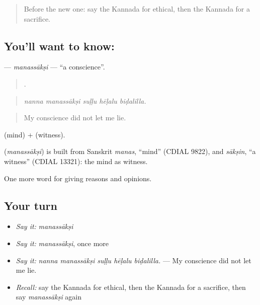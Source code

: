 \label{lesson:KA-C388-manassaksi}



\begin{quote}
Before the new one: say the Kannada for ethical, then the Kannada for a sacrifice.
\end{quote}

\subsection*{You'll want to know: }
\textbf{} — \emph{manassākṣi} — \textquotedblleft{}a conscience\textquotedblright{}.

\begin{quote}
    .
\end{quote}

\begin{quote}
\emph{nanna manassākṣi suḷḷu hēḷalu biḍalilla.}
\end{quote}

\begin{quote}
My conscience did not let me lie.
\end{quote}

 (mind) +  (witness).

\begin{cousinweb}
\textbf{} (\emph{manassākṣi}) is built from Sanskrit \emph{manas}, \textquotedblleft{}mind\textquotedblright{} (CDIAL 9822), and \emph{sākṣin}, \textquotedblleft{}a witness\textquotedblright{} (CDIAL 13321): the mind as witness.
\end{cousinweb}

\begin{grammarlens}[title={What you've built}]
One more word for giving reasons and opinions.
\end{grammarlens}

\subsection*{Your turn}
\begin{itemize}
\raggedright
  \item \emph{Say it:} \emph{manassākṣi}
  \item \emph{Say it:} \emph{manassākṣi}, once more
  \item \emph{Say it:} \emph{nanna manassākṣi suḷḷu hēḷalu biḍalilla.} — My conscience did not let me lie.
  \item \emph{Recall:} say the Kannada for ethical, then the Kannada for a sacrifice, then say \emph{manassākṣi} again
\end{itemize}

